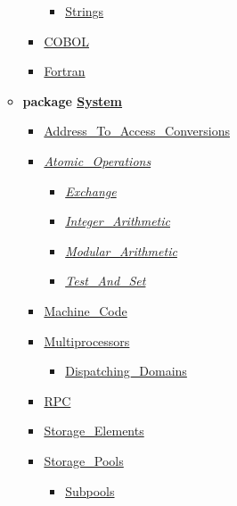 \documentclass[english]{article}
\begin{document}
\begin{scriptsize}
\begin{multicols*}{5}
\begin{itemize}[leftmargin=0mm]
\begin{itemize}[leftmargin=5mm]
\begin{itemize}[leftmargin=5mm]
\begin{itemize}[leftmargin=5mm]
	  \item[] \href{http://www.ada-auth.org/standards/22rm/html/RM-B-3-1.html}{Strings}
	  \end{itemize}
	\item[] \href{http://www.ada-auth.org/standards/22rm/html/RM-B-4.html}{COBOL}
	\item[] \href{http://www.ada-auth.org/standards/22rm/html/RM-B-5.html}{Fortran}
	\end{itemize}
  \item[] \textbf{package \href{http://www.ada-auth.org/standards/22rm/html/RM-13-7.html}{System}}
	\begin{itemize}[leftmargin=5mm]
	\item[] \href{http://www.ada-auth.org/standards/22rm/html/RM-13-7-2.html}{Address\_To\_Access\_Conversions}
	\item[] \href{http://www.ada-auth.org/standards/22rm/html/RM-C-6-1.html}{\textit{Atomic\_Operations}}
	  \begin{itemize}[leftmargin=5mm]
	  \item[] \href{http://www.ada-auth.org/standards/22rm/html/RM-C-6-2.html}{\textit{Exchange}}
	  \item[] \href{http://www.ada-auth.org/standards/22rm/html/RM-C-6-4.html}{\textit{Integer\_Arithmetic}}
	  \item[] \href{http://www.ada-auth.org/standards/22rm/html/RM-C-6-5.html}{\textit{Modular\_Arithmetic}}
	  \item[] \href{http://www.ada-auth.org/standards/22rm/html/RM-C-6-3.html}{\textit{Test\_And\_Set}}
	  \end{itemize}
	\item[] \href{http://www.ada-auth.org/standards/22rm/html/RM-13-8.html}{Machine\_Code}
	\item[] \href{http://www.ada-auth.org/standards/22rm/html/RM-D-16.html}{Multiprocessors}
	  \begin{itemize}[leftmargin=5mm]
	  \item[] \href{http://www.ada-auth.org/standards/22rm/html/RM-D-16-1.html}{Dispatching\_Domains}
      \end{itemize}
    \item[] \href{http://www.ada-auth.org/standards/22rm/html/RM-E-5.html}{RPC}
    \item[] \href{http://www.ada-auth.org/standards/22rm/html/RM-13-7-1.html}{Storage\_Elements}
    \item[] \href{http://www.ada-auth.org/standards/22rm/html/RM-13-11.html}{Storage\_Pools}
      \begin{itemize}[leftmargin=5mm]
      \item[] \href{http://www.ada-auth.org/standards/22rm/html/RM-13-11-4.html}{Subpools}
      \end{itemize}
    \end{itemize}
  \end{itemize}
\end{itemize}
\end{multicols*}
\end{scriptsize}
\end{document}

